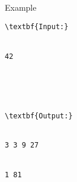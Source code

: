 Example
\begin{verbatim}
\textbf{Input:}


42





\textbf{Output:}


3 3 9 27


1 81


\end{verbatim}